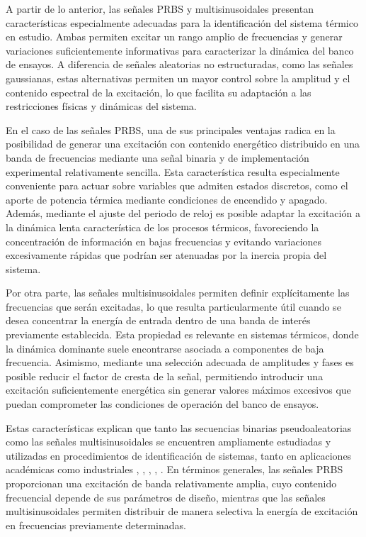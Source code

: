 \documentclass[11pt]{report}
\begin{document}
A partir de lo anterior, las señales PRBS y multisinusoidales presentan características especialmente adecuadas para la identificación del sistema térmico en estudio. Ambas permiten excitar un rango amplio de frecuencias y generar variaciones suficientemente informativas para caracterizar la dinámica del banco de ensayos. A diferencia de señales aleatorias no estructuradas, como las señales gaussianas, estas alternativas permiten un mayor control sobre la amplitud y el contenido espectral de la excitación, lo que facilita su adaptación a las restricciones físicas y dinámicas del sistema.

En el caso de las señales PRBS, una de sus principales ventajas radica en la posibilidad de generar una excitación con contenido energético distribuido en una banda de frecuencias mediante una señal binaria y de implementación experimental relativamente sencilla. Esta característica resulta especialmente conveniente para actuar sobre variables que admiten estados discretos, como el aporte de potencia térmica mediante condiciones de encendido y apagado. Además, mediante el ajuste del periodo de reloj es posible adaptar la excitación a la dinámica lenta característica de los procesos térmicos, favoreciendo la concentración de información en bajas frecuencias y evitando variaciones excesivamente rápidas que podrían ser atenuadas por la inercia propia del sistema.

Por otra parte, las señales multisinusoidales permiten definir explícitamente las frecuencias que serán excitadas, lo que resulta particularmente útil cuando se desea concentrar la energía de entrada dentro de una banda de interés previamente establecida. Esta propiedad es relevante en sistemas térmicos, donde la dinámica dominante suele encontrarse asociada a componentes de baja frecuencia. Asimismo, mediante una selección adecuada de amplitudes y fases es posible reducir el factor de cresta de la señal, permitiendo introducir una excitación suficientemente energética sin generar valores máximos excesivos que puedan comprometer las condiciones de operación del banco de ensayos.

Estas características explican que tanto las secuencias binarias pseudoaleatorias como las señales multisinusoidales se encuentren ampliamente estudiadas y utilizadas en procedimientos de identificación de sistemas, tanto en aplicaciones académicas como industriales \cite{DRGONA2020190}, \cite{6842658}, \cite{aerospace12020074}, \cite{csurcsia2020user}, \cite{1655392}. En términos generales, las señales PRBS proporcionan una excitación de banda relativamente amplia, cuyo contenido frecuencial depende de sus parámetros de diseño, mientras que las señales multisinusoidales permiten distribuir de manera selectiva la energía de excitación en frecuencias previamente determinadas.
\end{document}
